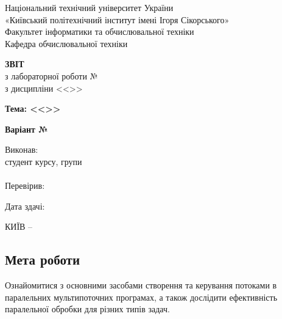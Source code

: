 \documentclass[14pt, a4paper]{extreport}
\begin{document}
	
	\begin{titlepage}
		\begin{center}
			\normalsize
			Національний технічний університет України\\
			«Київський політехнічний інститут імені Ігоря Сікорського» \\[0.5em]
			Факультет інформатики та обчислювальної техніки\\
			Кафедра обчислювальної техніки
			
			\vfill
			
			{\large \textbf{ЗВІТ}\\[0.5em]}
			{з лабораторної роботи №\LabNumber \\}
			{з дисципліни <<\CourseTitle>>}
			
			\vspace{2em}
			
			{\textbf{Тема: <<\Topic>>}}
			
			\vspace{1em}
			
			{\textbf{Варіант №\Variant}}
			
			\vfill
			
			\begin{flushright}
				Виконав: \\ студент \CourseNumber{} курсу, групи \StudentGroup \\
				\StudentName \\[1em]
				Перевірив: \\ \Teacher
			\end{flushright}
			
			\vfill
			
			\begin{flushright}
				Дата здачі: \DTMtoday
			\end{flushright}
			
			\vspace{5em}
			КИЇВ -- \ReportYear
		\end{center}
	\end{titlepage}
	
	\clearpage
	\setcounter{page}{2}
	
	\subsection*{Мета роботи} 
	Ознайомитися з основними засобами створення та керування потоками в паралельних мультипоточних програмах, а також дослідити ефективність паралельної обробки для різних типів задач.
	
\end{document}
